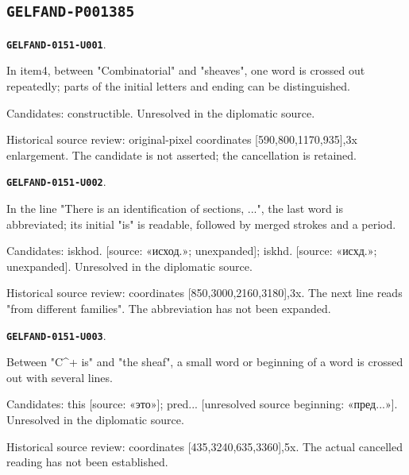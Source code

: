 \documentclass[11pt]{article}
\theoremstyle{definition}
\theoremstyle{remark}
\begin{document}
\subsection*{\texttt{GELFAND-P001385}}
\par\noindent\leavevmode{}\label{GELFAND-0151-U001}\label{GELFAND-P001385:cancelled-upper:note}\textbf{\texttt{GELFAND-0151-U001}}.\nopagebreak[4]\par
In item4, between "Combinatorial" and "sheaves", one word is crossed out repeatedly; parts of the initial letters and ending can be distinguished.\par
Candidates: constructible. Unresolved in the diplomatic source.\par
Historical source review: original-pixel coordinates [590,800,1170,935],3x enlargement. The candidate is not asserted; the cancellation is retained.\par\medskip
\par\noindent\leavevmode{}\label{GELFAND-0151-U002}\label{GELFAND-P001385:lower-gluing:note}\textbf{\texttt{GELFAND-0151-U002}}.\nopagebreak[4]\par
In the line "There is an identification of sections, ...", the last word is abbreviated; its initial "is" is readable, followed by merged strokes and a period.\par
Candidates: iskhod. [source: «исход.»; unexpanded]; iskhd. [source: «исхд.»; unexpanded]. Unresolved in the diplomatic source.\par
Historical source review: coordinates [850,3000,2160,3180],3x. The next line reads "from different families". The abbreviation has not been expanded.\par\medskip
\par\noindent\leavevmode{}\label{GELFAND-0151-U003}\label{GELFAND-P001385:cancelled-bottom:note}\textbf{\texttt{GELFAND-0151-U003}}.\nopagebreak[4]\par
Between "C\textasciicircum{}+ is" and "the sheaf", a small word or beginning of a word is crossed out with several lines.\par
Candidates: this [source: «это»]; pred... [unresolved source beginning: «пред...»]. Unresolved in the diplomatic source.\par
Historical source review: coordinates [435,3240,635,3360],5x. The actual cancelled reading has not been established.\par\medskip
\end{document}
